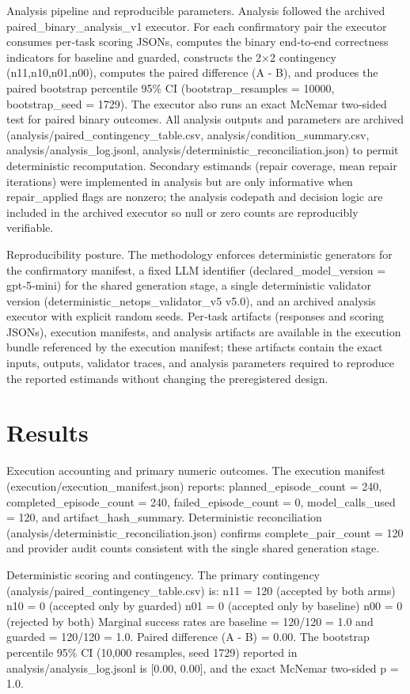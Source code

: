 \documentclass[conference]{IEEEtran}
\begin{document}
Analysis pipeline and reproducible parameters. Analysis followed the archived paired\_binary\_analysis\_v1 executor. For each confirmatory pair the executor consumes per‑task scoring JSONs, computes the binary end‑to‑end correctness indicators for baseline and guarded, constructs the 2\ensuremath{\times}2 contingency (n11,n10,n01,n00), computes the paired difference (A - B), and produces the paired bootstrap percentile 95\% CI (bootstrap\_resamples = 10000, bootstrap\_seed = 1729). The executor also runs an exact McNemar two‑sided test for paired binary outcomes. All analysis outputs and parameters are archived (analysis/paired\_contingency\_table.csv, analysis/condition\_summary.csv, analysis/analysis\_log.jsonl, analysis/deterministic\_reconciliation.json) to permit deterministic recomputation. Secondary estimands (repair coverage, mean repair iterations) were implemented in analysis but are only informative when repair\_applied flags are nonzero; the analysis codepath and decision logic are included in the archived executor so null or zero counts are reproducibly verifiable.

Reproducibility posture. The methodology enforces deterministic generators for the confirmatory manifest, a fixed LLM identifier (declared\_model\_version = gpt‑5‑mini) for the shared generation stage, a single deterministic validator version (deterministic\_netops\_validator\_v5 v5.0), and an archived analysis executor with explicit random seeds. Per‑task artifacts (responses and scoring JSONs), execution manifests, and analysis artifacts are available in the execution bundle referenced by the execution manifest; these artifacts contain the exact inputs, outputs, validator traces, and analysis parameters required to reproduce the reported estimands without changing the preregistered design.

\section{Results}
Execution accounting and primary numeric outcomes. The execution manifest (execution/execution\_manifest.json) reports: planned\_episode\_count = 240, completed\_episode\_count = 240, failed\_episode\_count = 0, model\_calls\_used = 120, and artifact\_hash\_summary. Deterministic reconciliation (analysis/deterministic\_reconciliation.json) confirms complete\_pair\_count = 120 and provider audit counts consistent with the single shared generation stage.

Deterministic scoring and contingency. The primary contingency (analysis/paired\_contingency\_table.csv) is:
\textbullet{} n11 = 120 (accepted by both arms)
\textbullet{} n10 = 0 (accepted only by guarded)
\textbullet{} n01 = 0 (accepted only by baseline)
\textbullet{} n00 = 0 (rejected by both)
Marginal success rates are baseline = 120/120 = 1.0 and guarded = 120/120 = 1.0. Paired difference (A - B) = 0.00. The bootstrap percentile 95\% CI (10,000 resamples, seed 1729) reported in analysis/analysis\_log.jsonl is [0.00, 0.00], and the exact McNemar two‑sided p = 1.0.
\end{document}
